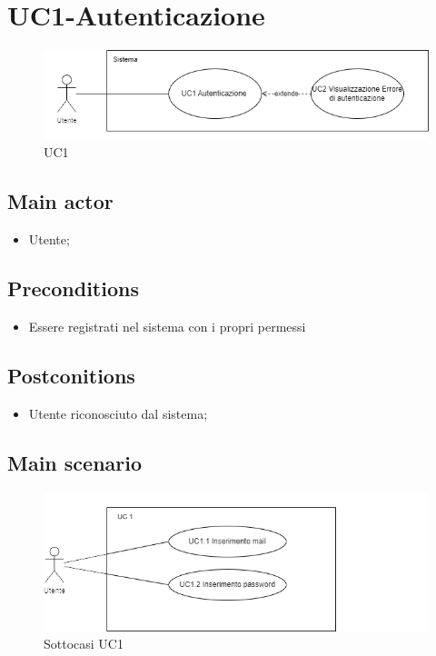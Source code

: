 \documentclass{article}
\begin{document}
\section{UC1-Autenticazione}
    \begin{figure}[h]
      \centering
      \includegraphics{./imgUML/UC1.png}
      \caption{UC1}
      \label{fig:UC1}
    \end{figure} 
    
     \subsection*{Main actor}
         \begin{itemize}
             \item Utente;
         \end{itemize}
     \subsection*{Preconditions} 
        \begin{itemize}
            \item Essere registrati nel sistema con i propri permessi
        \end{itemize}
               
    \subsection*{Postconitions}
        \begin{itemize}
            \item Utente riconosciuto dal sistema;
        \end{itemize}
    \subsection*{Main scenario}
        \begin{figure}[h]
            \centering
            \includegraphics{./imgUML/UC1-zoom.png}
            \caption{Sottocasi UC1}
            \label{fig:UC1_sottocasi}
        \end{figure}
            
\end{document}
